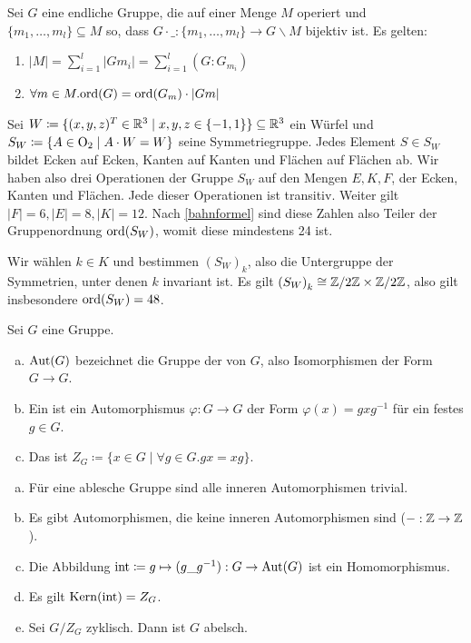 \begin{satz}[Bahnengleichung]
  \label{bahnformel}
  Sei \(G\) eine endliche Gruppe, die auf einer Menge \(M\) operiert und
  \(\{m_1,\dots,m_l\}\subseteq M\) so, dass \(G\cdot\_:\{m_1,\dots,m_l\}\to G\backslash M\) bijektiv ist.
  Es gelten:
  \begin{enumerate}
  \item \( |M| = \sum_{i=1}^l|Gm_i|=\sum_{i=1}^l (G : G_{m_i}) \)
  \item \(\forall m\in M. \mathrm{ord}(G) = \mathrm{ord}(G_m)\cdot |Gm| \) 
  \end{enumerate}
\end{satz}

\begin{beispiel}
  Sei \(W\coloneq \{(x,y,z)^T\in \mathbb{R}^3\mid x,y,z\in\{-1,1\}\}\subseteq \mathbb{R}^3\) ein Würfel und \(S_W\coloneq \{A\in \mathrm{O}_2\mid A\cdot W=W\}\) seine Symmetriegruppe.
  Jedes Element \(S\in S_W\) bildet Ecken auf Ecken, Kanten auf Kanten und Flächen auf Flächen ab. Wir haben also drei Operationen der Gruppe \(S_W\) auf den Mengen \(E,K,F\), der Ecken, Kanten und Flächen.
  Jede dieser Operationen ist transitiv. Weiter gilt \(|F|=6,|E|=8,|K|=12\).
  Nach \ref{bahnformel} sind diese Zahlen also Teiler der Gruppenordnung \(\mathrm{ord}(S_W)\), womit diese mindestens 24 ist.

  Wir wählen \(k\in K\) und bestimmen \(\left(S_W\right)_k\), also die Untergruppe  der Symmetrien, unter denen \(k\) invariant ist. Es gilt \(\left(S_W\right)_k\cong \mathbb{Z}/2\mathbb{Z}\times \mathbb{Z}/2\mathbb{Z}\), also gilt insbesondere \(\mathrm{ord}(S_W)=48\).
\end{beispiel}


\begin{definition}
  Sei \(G\) eine Gruppe.
  \begin{enumerate}[(a)]
  \item \(\mathrm{Aut}(G)\) bezeichnet die Gruppe der  von \(G\), also Isomorphismen der Form \(G\to G\).
  \item Ein  ist ein Automorphismus \(\varphi:G\to G\) der Form \(\varphi(x)=gxg^{-1}\) für ein festes \(g\in G\).
  \item Das  ist \(Z_G\coloneq \{x\in G\mid \forall g\in G. gx=xg\}\).
  \end{enumerate}
\end{definition}

\begin{bemerkung}
  \begin{enumerate}[(a)]
  \item Für eine ablesche Gruppe sind alle inneren Automorphismen trivial.
  \item Es gibt Automorphismen, die keine inneren Automorphismen sind (\(-:\mathbb{Z}\to \mathbb{Z}\)).
  \item Die Abbildung \(\mathrm{int}\coloneq g\mapsto (g\_g^{-1}):G\to \mathrm{Aut}(G)\) ist ein Homomorphismus.
  \item Es gilt \(\mathrm{Kern}(\mathrm{int})=Z_G\).
  \item Sei \(G/Z_G\) zyklisch. Dann ist \(G\) abelsch.
  \end{enumerate}
\end{bemerkung}

